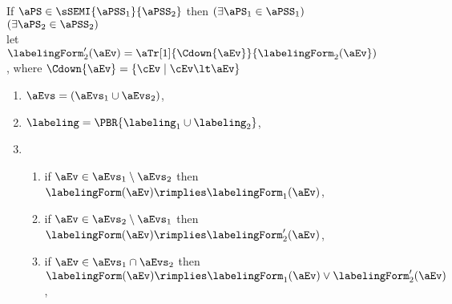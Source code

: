 \begin{figure}
  \noindent
  If $\aPS \in \sSEMI{\aPSS_1}{\aPSS_2}$ then $(\exists\aPS_1\in\aPSS_1)$
  $(\exists\aPS_2\in\aPSS_2)$\\
  let $\labelingForm'_2(\aEv)=\aTr[1]{\Cdown{\aEv}}{\labelingForm_2(\aEv})$,
  where
  $\Cdown{\aEv}=\{ \cEv \mid \cEv \lt \aEv \}$%
  \begin{multicols}{2}
    \begin{enumerate}[topsep=0pt,label=(\textsc{s}\arabic*),ref=\textsc{s}\arabic*]
    \item \label{seq-E}
      $\aEvs = (\aEvs_1\cup\aEvs_2)$,
    \item \label{seq-lambda}
      ${\labeling}=\PBR{{\labeling_1}\cup {\labeling_2}}$, 
    \item[] 
      \begin{enumerate}[leftmargin=0pt]
      \item \label{seq-kappa1}
        if $\aEv\in\aEvs_1\setminus\aEvs_2$ then $\labelingForm(\aEv) \rimplies \labelingForm_1(\aEv)$,
      \item \label{seq-kappa2}
        if $\aEv\in\aEvs_2\setminus\aEvs_1$ then $\labelingForm(\aEv) \rimplies \labelingForm'_2(\aEv)$,
      \item \label{seq-kappa12}
        if $\aEv\in\aEvs_1\cap\aEvs_2$ then $\labelingForm(\aEv) \rimplies \labelingForm_1(\aEv)\lor\labelingForm'_2(\aEv)$,

\end{enumerate}
\end{enumerate}
\end{multicols}
\end{figure}
